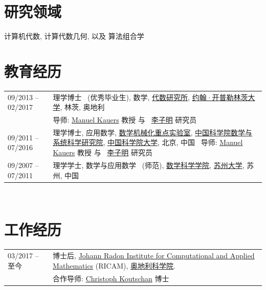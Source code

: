 \documentclass[a4paper,12pt]{article}
\begin{document}
\begin{CJK*}{UTF8}{gbsn}
\section*{\Large{研究领域}}
计算机代数, 计算代数几何, 以及 算法组合学  

\section*{\Large{教育经历}}
\begin{tabular}{@{}p{1.4in}p{4in}}
09/2013 -- 02/2017    & 理学博士 \ (优秀毕业生), 数学,  
                        \href{http://www.jku.at/algebra/content}{代数研究所}, 
                        \href{http://www.jku.at/content}{约翰·开普勒林茨大学}, 林茨, 奥地利 \\                        
                      & 导师: \href{http://www.kauers.de/}{Manuel Kauers} 教授 与  
                         \ \href{http://mmrc.iss.ac.cn/~zmli/}{李子明} 研究员\\
09/2011 -- 07/2016    & 理学博士,  应用数学, 
                        \href{http://english.mmrc.amss.cas.cn/}{数学机械化重点实验室}, 
                        \href{http://www.amss.ac.cn/}{中国科学院数学与系统科学研究院}, 
                        \href{http://www.gucas.ac.cn/}{中国科学院大学}, 北京, 中国 
                        \ 导师: \href{http://www.kauers.de/}{Manuel Kauers} 教授 与  
                         \ \href{http://mmrc.iss.ac.cn/~zmli/}{李子明} 研究员\\
09/2007 -- 07/2011    & 理学学士, 数学与应用数学 \ (师范), \href{http://math.suda.edu.cn/}{数学科学学院}, 
                        \href{http://www.suda.edu.cn/}{苏州大学}, 苏州, 中国
\end{tabular} \\


\section*{\Large{工作经历}}
\begin{tabular}{@{}p{1.4in}p{4in}}
03/2017 -- 至今        & 博士后, 
                        \href{https://www.ricam.oeaw.ac.at/}{Johann Radon Institute for Computational and Applied Mathematics} (RICAM),
                        \href{http://www.oeaw.ac.at/en/austrian-academy-of-sciences/}{奥地利科学院}. \\                       
                       & 合作导师: \href{http://www.koutschan.de/}{Christoph Koutschan} 博士\\
\end{tabular}


\end{CJK*}
\end{document}
